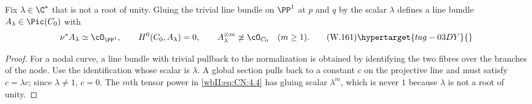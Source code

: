 \begin{lemma}
\hypertarget{tag-03IB}{}\label{wbII:lem:gluing-bundle}

Fix $\lambda\in\C^*$ that is not a root of unity.  Gluing the trivial line
bundle on $\PP^1$ at $p$ and $q$ by the scalar $\lambda$ defines a line bundle
\(A_\lambda\in\Pic(C_0)\) with
\[
 \nu^*A_\lambda\simeq\cO_{\PP^1},\qquad
 H^0(C_0,A_\lambda)=0,\qquad
 A_\lambda^{\otimes m}\not\simeq\cO_{C_0}\quad(m\ge1).
 \tag{W.161}\hypertarget{tag-03DY}{}\label{wbII:eq:CN:4.4}
\]
\end{lemma}



\begin{proof}
For a nodal curve, a line bundle with trivial pullback to the normalization
is obtained by identifying the two fibres over the branches of the node.
Use the identification whose scalar is $\lambda$.  A global section pulls
back to a constant $c$ on the projective line and must satisfy
$c=\lambda c$; since $\lambda\ne1$, $c=0$.  The $m$th tensor power in \eqref{wbII:eq:CN:4.4} has
gluing scalar $\lambda^m$, which is never $1$ because $\lambda$ is not a
root of unity.

\end{proof}